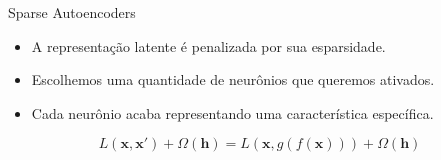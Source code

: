 \documentclass[dvipsnames]{beamer}
\begin{document}
\begin{frame}{Sparse Autoencoders}

    \begin{itemize}
        \item A representação latente é penalizada por sua esparsidade.
        \item Escolhemos uma quantidade de neurônios que queremos ativados.
        \item Cada neurônio acaba representando uma característica específica.
    \end{itemize}

    $$L(\boldsymbol{x}, \boldsymbol{x'}) + \Omega(\boldsymbol{h}) = L(\boldsymbol{x}, g(f(\boldsymbol{x}))) + \Omega(\boldsymbol{h})$$

\end{frame}
\end{document}
